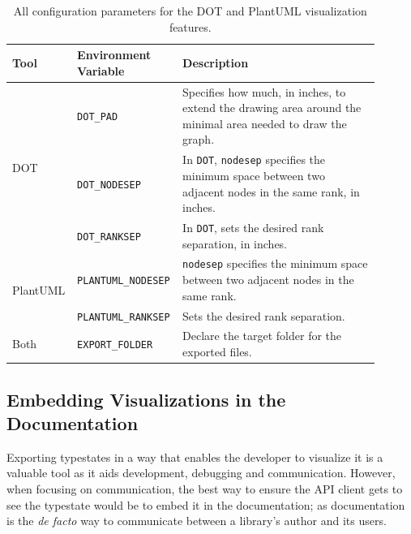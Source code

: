 \begin{table}[]
    \centering
    \begin{tabular}{p{0.12\linewidth}|p{0.25\linewidth}|p{0.53\linewidth}}
        Tool                      & Environment Variable       & Description                                                                                                           \\ \hline
        \multirow{3}{*}{DOT}      & \texttt{DOT\_PAD}          & Specifies how much, in inches, to extend the drawing area around the minimal area needed to draw the graph.           \\ \cline{2-3}
                                  & \texttt{DOT\_NODESEP}      & In \texttt{DOT}, \texttt{nodesep} specifies the minimum space between two adjacent nodes in the same rank, in inches. \\ \cline{2-3}
                                  & \texttt{DOT\_RANKSEP}      & In \texttt{DOT}, sets the desired rank separation, in inches.                                                         \\ \hline
        \multirow{2}{*}{PlantUML} & \texttt{PLANTUML\_NODESEP} & \texttt{nodesep} specifies the minimum space between two adjacent nodes in the same rank.                             \\ \cline{2-3}
                                  & \texttt{PLANTUML\_RANKSEP} & Sets the desired rank separation.                                                                                     \\ \hline
        Both                      & \texttt{EXPORT\_FOLDER}    & Declare the target folder for the exported files.
    \end{tabular}
    \caption{All configuration parameters for the DOT and PlantUML visualization features.}
    \label{tab:export-env-vars}
\end{table}

\subsection{Embedding Visualizations in the Documentation}\label{sec:extra-features:documentation-generation}

Exporting typestates in a way that enables the developer to visualize it is a valuable tool as it aids development, debugging and communication.
However, when focusing on communication, the best way to ensure the \gls{API} client gets to see the typestate would be to embed it in the documentation;
as documentation is the \emph{de facto} way to communicate between a library's author and its users.

